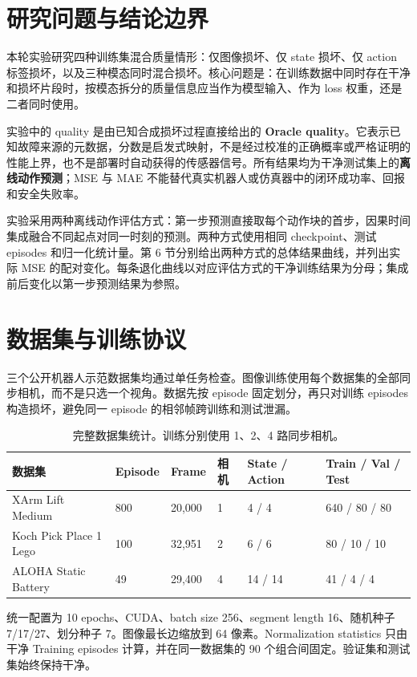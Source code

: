 \documentclass[11pt,a4paper]{ctexart}
\begin{document}
\section{研究问题与结论边界}

本轮实验研究四种训练集混合质量情形：仅图像损坏、仅 state 损坏、仅 action 标签损坏，以及三种模态同时混合损坏。核心问题是：在训练数据中同时存在干净和损坏片段时，按模态拆分的质量信息应当作为模型输入、作为 loss 权重，还是二者同时使用。

实验中的 quality 是由已知合成损坏过程直接给出的 \textbf{Oracle quality}。它表示已知故障来源的元数据，分数是启发式映射，不是经过校准的正确概率或严格证明的性能上界，也不是部署时自动获得的传感器信号。所有结果均为干净测试集上的\textbf{离线动作预测}；MSE 与 MAE 不能替代真实机器人或仿真器中的闭环成功率、回报和安全失败率。

实验采用两种离线动作评估方式：第一步预测直接取每个动作块的首步，因果时间集成融合不同起点对同一时刻的预测。两种方式使用相同 checkpoint、测试 episodes 和归一化统计量。第 6 节分别给出两种方式的总体结果曲线，并列出实际 MSE 的配对变化。每条退化曲线以对应评估方式的干净训练结果为分母；集成前后变化以第一步预测结果为参照。

\section{数据集与训练协议}

三个公开机器人示范数据集均通过单任务检查。图像训练使用每个数据集的全部同步相机，而不是只选一个视角。数据先按 episode 固定划分，再只对训练 episodes 构造损坏，避免同一 episode 的相邻帧跨训练和测试泄漏。

\begin{table}[htbp]
\centering
\small
\begin{tabularx}{\linewidth}{Y C{14mm} C{18mm} C{14mm} C{22mm} C{24mm}}
\toprule
数据集 & Episode & Frame & 相机 & State / Action & Train / Val / Test\\
\midrule
XArm Lift Medium & 800 & 20,000 & 1 & 4 / 4 & 640 / 80 / 80\\
Koch Pick Place 1 Lego & 100 & 32,951 & 2 & 6 / 6 & 80 / 10 / 10\\
ALOHA Static Battery & 49 & 29,400 & 4 & 14 / 14 & 41 / 4 / 4\\
\bottomrule
\end{tabularx}
\caption{完整数据集统计。训练分别使用 1、2、4 路同步相机。}
\end{table}

统一配置为 10 epochs、CUDA、batch size 256、segment length 16、随机种子 7/17/27、划分种子 7。图像最长边缩放到 64 像素。Normalization statistics 只由干净 Training episodes 计算，并在同一数据集的 90 个组合间固定。验证集和测试集始终保持干净。
\end{document}
